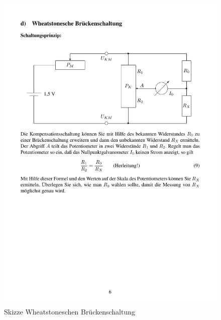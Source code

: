 \documentclass[12pt]{scrartcl}
\begin{document}
\begin{enumerate}
\begin{enumerate}
\begin{figure}[htbp] 
	\centering
		\includegraphics[trim = 1mm 125mm 1mm 30mm, clip, scale = 1]{wheat.pdf}
		\caption[Skizze Wheatstoneschen Brückenschaltung]{Skizze Wheatstoneschen Brückenschaltung\footnotemark}
		\label{fig:wheat}
\end{figure}




\end{enumerate}
\end{enumerate}
\end{document}
